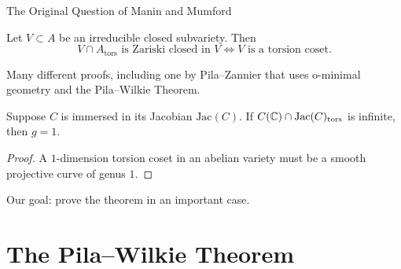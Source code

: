 \documentclass{beamer}
\begin{document}
\begin{frame}{The Original Question of Manin and Mumford}
  \begin{theorem}
    Let $V\subset A$ be an irreducible closed subvariety. Then
    \begin{equation*}
      V\cap A_{\mathrm{tors}} \text{ is Zariski closed in $V$}
      \Longleftrightarrow \text{$V$ is a torsion coset.}
    \end{equation*}
  \end{theorem}
  Many different proofs, including one by Pila--Zannier
  that uses \alert{o-minimal geometry} and the
    \alert{Pila--Wilkie Theorem}.

  \begin{corollary}
    Suppose
    $C$ is immersed in its Jacobian $\mathrm{Jac}(C)$. If $C({\mathbb{C}})\cap
    \mathrm{Jac}(C)_{\mathrm{tors}}$ is infinite, then $g=1$. 
  \end{corollary}
  \begin{proof}
    A $1$-dimension torsion coset in an abelian variety must be a
    smooth projective curve of genus $1$. 
  \end{proof}
  \vspace{-.25cm}
  
  Our goal: prove the theorem in an important case.
\end{frame}

\section{The Pila--Wilkie Theorem}
\end{document}
